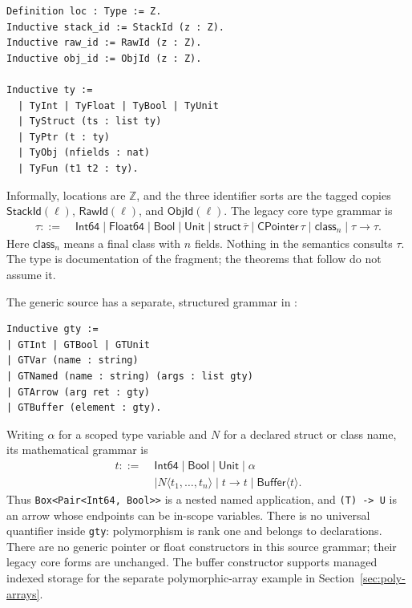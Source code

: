 \documentclass[11pt]{article}
\begin{document}
\begin{lstlisting}
Definition loc : Type := Z.
Inductive stack_id := StackId (z : Z).
Inductive raw_id := RawId (z : Z).
Inductive obj_id := ObjId (z : Z).

Inductive ty :=
  | TyInt | TyFloat | TyBool | TyUnit
  | TyStruct (ts : list ty)
  | TyPtr (t : ty)
  | TyObj (nfields : nat)
  | TyFun (t1 t2 : ty).
\end{lstlisting}

Informally, locations are \(\mathbb{Z}\), and the three identifier sorts are the tagged copies \(\mathsf{StackId}(\ell)\), \(\mathsf{RawId}(\ell)\), and \(\mathsf{ObjId}(\ell)\).
The legacy core type grammar is
\[
\begin{aligned}
\tau ::=\;&
  \mathsf{Int64}
  \mid \mathsf{Float64}
  \mid \mathsf{Bool}
  \mid \mathsf{Unit}
  \mid \mathsf{struct}\,\overline{\tau}
  \mid \mathsf{CPointer}\,\tau
  \mid \mathsf{class}_{n}
  \mid \tau \to \tau.
\end{aligned}
\]
Here \(\mathsf{class}_{n}\) means a final class with \(n\) fields.
Nothing in the semantics consults \(\tau\).
The type is documentation of the fragment; the theorems that follow do not assume it.

The generic source has a separate, structured grammar in
:
\begin{lstlisting}
Inductive gty :=
| GTInt | GTBool | GTUnit
| GTVar (name : string)
| GTNamed (name : string) (args : list gty)
| GTArrow (arg ret : gty)
| GTBuffer (element : gty).
\end{lstlisting}
Writing \(\alpha\) for a scoped type variable and \(N\) for a declared
struct or class name, its mathematical grammar is
\[
\begin{aligned}
  t ::=\;& \mathsf{Int64}\mid\mathsf{Bool}\mid\mathsf{Unit}\mid\alpha\\
        &\mid N\langle t_1,\ldots,t_n\rangle\mid t\to t
         \mid\mathsf{Buffer}\langle t\rangle.
\end{aligned}
\]
Thus \texttt{Box<Pair<Int64, Bool>>} is a nested named application, and
\texttt{(T) -> U} is an arrow whose endpoints can be in-scope variables.
There is no universal quantifier inside \texttt{gty}: polymorphism is
rank one and belongs to declarations. There are no generic pointer or float
constructors in this source grammar; their legacy core forms are unchanged.
The buffer constructor supports managed indexed storage for the separate
polymorphic-array example in Section~\ref{sec:poly-arrays}.
\end{document}
